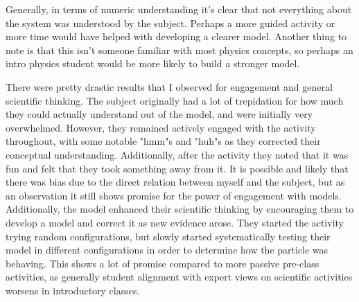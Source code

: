 \documentclass[11pt]{article}
\begin{document}
			Generally, in terms of numeric understanding it's clear that not everything about the system was understood by the subject. Perhaps a more guided activity or more time would have helped with developing a clearer model. Another thing to note is that this isn't someone familiar with most physics concepts, so perhaps an intro physics student would be more likely to build a stronger model.
			
			There were pretty drastic results that I observed for engagement and general scientific thinking. The subject originally had a lot of trepidation for how much they could actually understand out of the model, and were initially very overwhelmed. However, they remained actively engaged with the activity throughout, with some notable "hmm"s and "huh"s as they corrected their conceptual understanding. Additionally, after the activity they noted that it was fun and felt that they took something away from it. It is possible and likely that there was bias due to the direct relation between myself and the subject, but as an observation it still shows promise for the power of engagement with models. Additionally, the model enhanced their scientific thinking by encouraging them to develop a model and correct it as new evidence arose. They started the activity trying random configurations, but slowly started systematically testing their model in different configurations in order to determine how the particle was behaving. This shows a lot of promise compared to more passive pre-class activities, as generally student alignment with expert views on scientific activities worsens in introductory classes.
			
			
			
			
			
\end{document}
